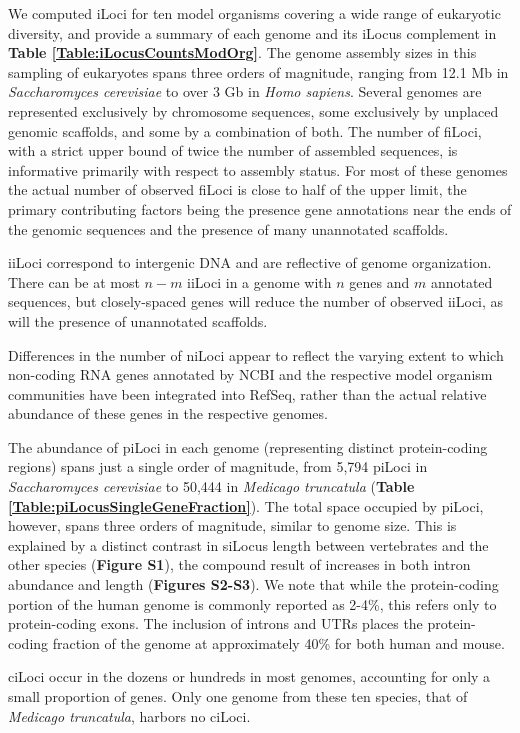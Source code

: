 We computed iLoci for ten model organisms covering a wide range of eukaryotic diversity, and provide a summary of each genome and its iLocus complement in \textbf{Table \ref{Table:iLocusCountsModOrg}}.
The genome assembly sizes in this sampling of eukaryotes spans three orders of magnitude, ranging from 12.1 Mb in \textit{Saccharomyces cerevisiae} to over 3 Gb in \textit{Homo sapiens}.
Several genomes are represented exclusively by chromosome sequences, some exclusively by unplaced genomic scaffolds, and some by a combination of both.
The number of fiLoci, with a strict upper bound of twice the number of assembled sequences, is informative primarily with respect to assembly status.
For most of these genomes the actual number of observed fiLoci is close to half of the upper limit, the primary contributing factors being the presence gene annotations near the ends of the genomic sequences and the presence of many unannotated scaffolds.

iiLoci correspond to intergenic DNA and are reflective of genome organization.
There can be at most $n-m$ iiLoci in a genome with $n$ genes and $m$ annotated sequences, but closely-spaced genes will reduce the number of observed iiLoci, as will the presence of unannotated scaffolds.

Differences in the number of niLoci appear to reflect the varying extent to which non-coding RNA genes annotated by NCBI and the respective model organism communities have been integrated into RefSeq, rather than the actual relative abundance of these genes in the respective genomes.

The abundance of piLoci in each genome (representing distinct protein-coding regions) spans just a single order of magnitude, from 5,794 piLoci in \textit{Saccharomyces cerevisiae} to 50,444 in \textit{Medicago truncatula} (\textbf{Table \ref{Table:piLocusSingleGeneFraction}}).
The total space occupied by piLoci, however, spans three orders of magnitude, similar to genome size.
This is explained by a distinct contrast in siLocus length between vertebrates and the other species (\textbf{Figure S1}), the compound result of increases in both intron abundance and length (\textbf{Figures S2-S3}).
We note that while the protein-coding portion of the human genome is commonly reported as 2-4\%, this refers only to protein-coding exons.
The inclusion of introns and UTRs places the protein-coding fraction of the genome at approximately 40\% for both human and mouse.

ciLoci occur in the dozens or hundreds in most genomes, accounting for only a small proportion of genes.
Only one genome from these ten species, that of \textit{Medicago truncatula}, harbors no ciLoci.

